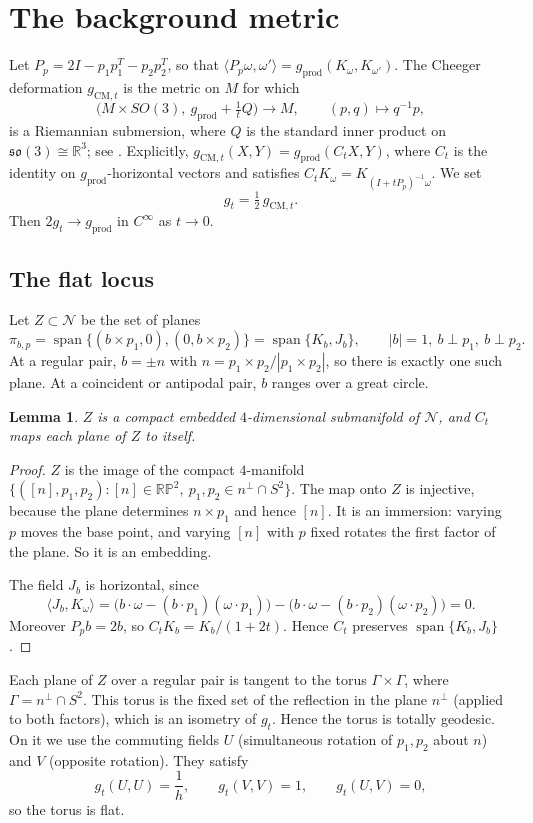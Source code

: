 \documentclass[11pt]{amsart}
\newtheorem{lemma}[theorem]{Lemma}
\theoremstyle{definition}
\theoremstyle{remark}
\newcommand{\R}{\mathbb{R}}
\newcommand{\RP}{\mathbb{RP}}
\newcommand{\gprod}{g_{\mathrm{prod}}}
\newcommand{\gCM}{g_{\mathrm{CM},t}}
\newcommand{\Gr}{\mathcal{N}}
\newcommand{\Span}{\operatorname{span}}
\begin{document}
\section{The background metric}\label{sec:background}

Let $P_p=2I-p_1p_1^{T}-p_2p_2^{T}$, so that $\langle P_p\omega,\omega'\rangle=\gprod(K_\omega,K_{\omega'})$. The Cheeger deformation $\gCM$ is the metric on $M$ for which
\[ \big(M\times SO(3),\ \gprod+\tfrac1tQ\big)\longrightarrow M,\qquad (p,q)\mapsto q^{-1}p, \]
is a Riemannian submersion, where $Q$ is the standard inner product on $\mathfrak{so}(3)\cong\R^3$; see \cite{Mu,Z}. Explicitly, $\gCM(X,Y)=\gprod(C_tX,Y)$, where $C_t$ is the identity on $\gprod$-horizontal vectors and satisfies $C_tK_\omega=K_{(I+tP_p)^{-1}\omega}$. We set
\[ g_t=\tfrac12\,\gCM . \]
Then $2g_t\to\gprod$ in $C^\infty$ as $t\to0$.

\subsection{The flat locus}
Let $Z\subset\Gr$ be the set of planes
\[ \pi_{b,p}=\Span\{(b\times p_1,0),(0,b\times p_2)\}=\Span\{K_b,J_b\},\qquad |b|=1,\ b\perp p_1,\ b\perp p_2 . \]
At a regular pair, $b=\pm n$ with $n=p_1\times p_2/|p_1\times p_2|$, so there is exactly one such plane. At a coincident or antipodal pair, $b$ ranges over a great circle.

\begin{lemma}\label{lem:Z}
$Z$ is a compact embedded $4$-dimensional submanifold of $\Gr$, and $C_t$ maps each plane of $Z$ to itself.
\end{lemma}

\begin{proof}
$Z$ is the image of the compact $4$-manifold $\{([n],p_1,p_2):[n]\in\RP^2,\ p_1,p_2\in n^\perp\cap S^2\}$. The map onto $Z$ is injective, because the plane determines $n\times p_1$ and hence $[n]$. It is an immersion: varying $p$ moves the base point, and varying $[n]$ with $p$ fixed rotates the first factor of the plane. So it is an embedding.

The field $J_b$ is horizontal, since
\[ \langle J_b,K_\omega\rangle=\big(b\cdot\omega-(b\cdot p_1)(\omega\cdot p_1)\big)-\big(b\cdot\omega-(b\cdot p_2)(\omega\cdot p_2)\big)=0 . \]
Moreover $P_pb=2b$, so $C_tK_b=K_b/(1+2t)$. Hence $C_t$ preserves $\Span\{K_b,J_b\}$.
\end{proof}

Each plane of $Z$ over a regular pair is tangent to the torus $\Gamma\times\Gamma$, where $\Gamma=n^\perp\cap S^2$. This torus is the fixed set of the reflection in the plane $n^\perp$ (applied to both factors), which is an isometry of $g_t$. Hence the torus is totally geodesic. On it we use the commuting fields $U$ (simultaneous rotation of $p_1,p_2$ about $n$) and $V$ (opposite rotation). They satisfy
\[ g_t(U,U)=\frac1h,\qquad g_t(V,V)=1,\qquad g_t(U,V)=0, \]
so the torus is flat.
\end{document}
